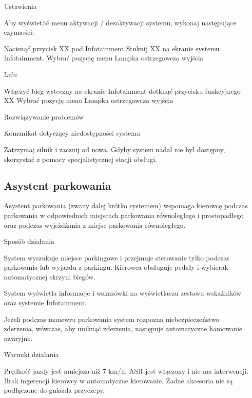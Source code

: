 Ustawienia

Aby wyświetlić menu aktywacji / dezaktywacji systemu, wykonaj następujące czynności:
\begin{itemizeArrow}
	\itemArrow Nacisnąć przycisk XX pod Infotainment Stuknij XX na ekranie systemu Infotainment.
	\itemArrow Wybrać pozycję menu Lampka ostrzegawcza wyjścia
\end{itemizeArrow}
Lub:
\begin{itemizeArrow}
	\itemArrow Włączyć bieg wsteczny na ekranie Infotainment dotknąć przycisku funkcyjnego XX 
	\itemArrow Wybrać pozycję menu Lampka ostrzegawcza wyjścia
\end{itemizeArrow}

Rozwiązywanie problemów

Komunikat dotyczący niedostępności systemu
\begin{itemizeArrow}
	\itemArrow Zatrzymaj silnik i zacznij od nowa.
	\itemArrow Gdyby system nadal nie był dostępny, skorzystać z pomocy specjalistycznej stacji obsługi.
\end{itemizeArrow}

\subsection{Asystent parkowania}

Asystent parkowania (zwany dalej krótko systemem) wspomaga kierowcę podczas parkowania w odpowiednich miejscach parkowania równoległego i prostopadłego oraz podczas wyjeżdżania z miejsc parkowania równoległego.

Sposób działania

System wyszukuje miejsce parkingowe i przejmuje sterowanie tylko podczas parkowania lub wyjazdu z parkingu. Kierowca obsługuje pedały i wybierak automatycznej skrzyni biegów.

System wyświetla informacje i wskazówki na wyświetlaczu zestawu wskaźników oraz systemie Infotainment.

Jeżeli podczas manewru parkowania system rozpozna niebezpieczeństwo zderzenia, wówczas, aby uniknąć zderzenia, następuje automatyczne hamowanie awaryjne.

Warunki działania
\begin{itemizeTick}
	\itemTick Prędkość jazdy jest mniejsza niż 7 km/h.
	\itemTick ASR jest włączony i nie ma interwencji.
	\itemTick Brak ingerencji kierowcy w automatyczne kierowanie.
	\itemTick Żadne akcesoria nie są podłączone do gniazda przyczepy.
\end{itemizeTick}

